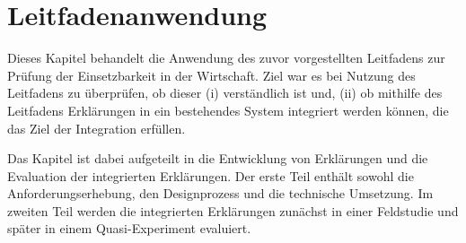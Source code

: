 \chapter{Leitfadenanwendung}
\label{sec:model_evaluation}

Dieses Kapitel behandelt die Anwendung des zuvor vorgestellten Leitfadens zur Prüfung der Einsetzbarkeit in der Wirtschaft. Ziel war es bei Nutzung des Leitfadens zu überprüfen, ob dieser (i) verständlich ist und, (ii) ob mithilfe des Leitfadens Erklärungen in ein bestehendes System integriert werden können, die das Ziel der Integration erfüllen.

Das Kapitel ist dabei aufgeteilt in die Entwicklung von Erklärungen und die Evaluation der integrierten Erklärungen. Der erste Teil enthält sowohl die Anforderungserhebung, den Designprozess und die technische Umsetzung. Im zweiten Teil werden die integrierten Erklärungen zunächst in einer Feldstudie und später in einem Quasi-Experiment evaluiert.



